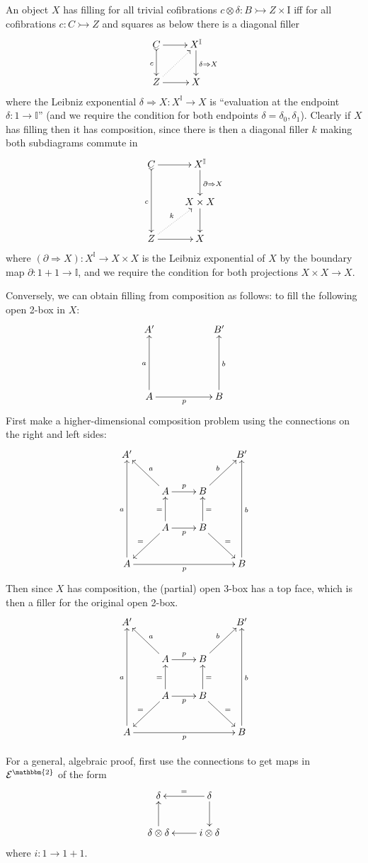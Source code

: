 \documentclass[12pt]{article}
\newcommand{\mono}{\ensuremath{\rightarrowtail}}
\newcommand{\ra}{\ensuremath{\rightarrow}}
\newcommand{\I}{\ensuremath{\mathrm{I}}}
\newcommand{\II}{\ensuremath{\mathbb{I}}}
\theoremstyle{remark}
\theoremstyle{definition}
\begin{document}
An object $X$ has filling for all trivial cofibrations  $c\otimes \delta : B \mono Z\times \I$ iff for all cofibrations $c : C \mono Z$ and squares as below there is a diagonal filler
\[
\xymatrix{
 C \ar@{>->}[d]_{c} \ar[r] & X^\II  \ar[d]^{\delta\Rightarrow X} \\
 Z\ar[r] \ar@{..>}[ru] & X
}
\]
where the Leibniz exponential $\delta\Rightarrow X : X^\II \ra X$ is ``evaluation at the endpoint $\delta: 1 \ra \II$'' (and we require the condition for both endpoints $\delta = \delta_0 , \delta_1$).  Clearly if $X$ has filling then it has composition, since there is then a diagonal filler $k$ making both subdiagrams commute in
\[
\xymatrix{
 C \ar@{>->}[dd]_{c} \ar[r] & X^\II  \ar[d]^{\partial\Rightarrow X} \\
 	& X\times X  \ar[d] \\
 Z\ar[r] \ar@{..>}[ru]^k & X
}
\]
where $(\partial\Rightarrow X) : X^\II \ra X\times X$ is the Leibniz exponential of $X$ by the boundary map $\partial: 1+1 \ra \II$, and we require the condition for both projections $X\times X\ra X$.

Conversely, we can obtain filling from composition as follows: 
to fill the following open 2-box in $X$:
\[
\xymatrix{
A'&& B'  \\
\\
A \ar[uu]^a \ar[rr]_p && B \ar[uu]_b  
}
\]
First make a higher-dimensional composition problem using the connections on the right and left sides: 
\[
\xymatrix{
A' &&& B'  \\
 & A \ar[lu]_a \ar[r]^p & B \ar[ru]^b & \\
 & A \ar[ld]_= \ar[r]_p \ar[u]^=  & B \ar[u]_= \ar[rd]^= & \\
A \ar[uuu]^a \ar[rrr]_p &&&  B  \ar[uuu]_b 
}
\]
Then since $X$ has composition, the (partial) open 3-box has a top face, which is then a filler for the original open 2-box.
\[
\xymatrix{
A' &&& B'  \\
 & A \ar[lu]_a \ar[r]^p & B \ar[ru]^b & \\
 & A \ar[ld]_= \ar[r]_p \ar[u]^=  & B \ar[u]_= \ar[rd]^= & \\
A \ar[uuu]^a \ar[rrr]_p &&&  B  \ar[uuu]_b
}
\]

For a general, algebraic proof, first 
use the connections to get maps in $\mathcal{E}^\mathbbm{2}$ of the form
\[
\xymatrix{
\delta  & \ar[l]_=\delta \ar[d] \\
\delta \otimes \delta \ar[u] & i \otimes \delta  \ar[l] 
}
\]
where $i : 1 \ra 1+1$.
\end{document}
